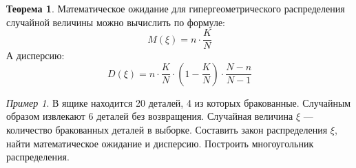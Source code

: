 \documentclass[12pt,a4paper]{article}
\theoremstyle{definition}
\theoremstyle{definition}
\newtheorem{theorem}{Теорема}[section]
\theoremstyle{remark}
\theoremstyle{corollary}
\theoremstyle{bolditalic}
\newtheorem{example}{Пример}[section]
\begin{document}
\begin{theorem}
     Математическое ожидание для гипергеометрического распределения случайной величины можно вычислить по формуле:
     \[
     M(\xi)=n\cdot \frac{K}{N}
     \]
     А дисперсию:
      \[
      D(\xi)=n\cdot \frac{K}{N} \cdot \left(1-\frac{K}{N} \right)\cdot \frac{N-n}{N-1}
      \]
 \end{theorem}

 \begin{example}
    В ящике находится 20 деталей, 4 из которых бракованные. Случайным образом извлекают 6 деталей без возвращения. Случайная величина $\xi$ — количество бракованных деталей в выборке. Составить закон распределения $\xi$, найти математическое ожидание и дисперсию. Построить многоугольник распределения.
\end{example}
\end{document}
